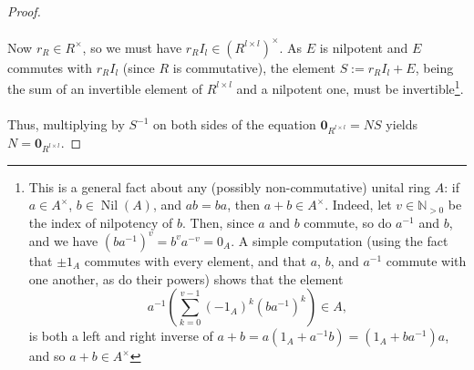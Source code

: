 \documentclass[11pt, a4paper, oneside]{article}
\theoremstyle{remark}
\theoremstyle{lemma}
\begin{document}
\begin{proof}
\\\\
Now \( r_{R} \in R^{\times} \), so we must have \( r_{R} I_{l} \in \left(R^{l\times l}\right)^{\times} \). As \( E \) is nilpotent and \( E \) commutes with \( r_{R} I_{l} \) (since \( R \) is commutative), the element \( S := r_{R} I_{l} + E \), being the sum of an invertible element of \( R^{l\times l} \) and a nilpotent one, must be invertible\footnote{This is a general fact about any (possibly non-commutative) unital ring \( A \): if \( a \in A^{\times} \), \( b \in \operatorname{Nil}(A) \), and \( ab = ba \), then \( a + b \in A^{\times} \). Indeed, let \( v \in \mathbb{N}_{>0} \) be the index of nilpotency of \( b \). Then, since \( a \) and \( b \) commute, so do \( a^{-1} \) and \( b \), and we have \( \left(ba^{-1}\right)^v = b^va^{-v} = 0_{A} \). A simple computation (using the fact that \( \pm 1_{A} \) commutes with every element, and that \( a \), \( b \), and \( a^{-1} \) commute with one another, as do their powers) shows that the element
\[
a^{-1} \left( \sum_{k=0}^{v-1} \left(-1_{A}\right)^k \left(b a^{-1}\right)^k \right)\in A,
\]
is both a left and right inverse of \( a + b = a \left(1_{A} + a^{-1} b\right)=\left(1_{A} + ba^{-1}\right)a\), and so $a+b\in A^{\times}$}.
\\\\
Thus, multiplying by \( S^{-1} \) on both sides of the equation \( \mathbf{0}_{R^{l\times l}} = N S \) yields \( N = \mathbf{0}_{R^{l\times l}} \).
\end{proof}
\end{document}
